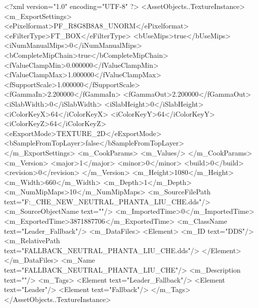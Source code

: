 <?xml version="1.0" encoding="UTF-8" ?>
<AssetObjects..TextureInstance>
	<m_ExportSettings>
		<ePixelformat>PF_R8G8B8A8_UNORM</ePixelformat>
		<eFilterType>FT_BOX</eFilterType>
		<bUseMips>true</bUseMips>
		<iNumManualMips>0</iNumManualMips>
		<bCompleteMipChain>true</bCompleteMipChain>
		<fValueClampMin>0.000000</fValueClampMin>
		<fValueClampMax>1.000000</fValueClampMax>
		<fSupportScale>1.000000</fSupportScale>
		<fGammaIn>2.200000</fGammaIn>
		<fGammaOut>2.200000</fGammaOut>
		<iSlabWidth>0</iSlabWidth>
		<iSlabHeight>0</iSlabHeight>
		<iColorKeyX>64</iColorKeyX>
		<iColorKeyY>64</iColorKeyY>
		<iColorKeyZ>64</iColorKeyZ>
		<eExportMode>TEXTURE_2D</eExportMode>
		<bSampleFromTopLayer>false</bSampleFromTopLayer>
	</m_ExportSettings>
	<m_CookParams>
		<m_Values/>
	</m_CookParams>
	<m_Version>
		<major>1</major>
		<minor>0</minor>
		<build>0</build>
		<revision>0</revision>
	</m_Version>
	<m_Height>1080</m_Height>
	<m_Width>660</m_Width>
	<m_Depth>1</m_Depth>
	<m_NumMipMaps>10</m_NumMipMaps>
	<m_SourceFilePath text="F:\MOD\TEMPLATE\LIU_CHE_NEW\FALLBACK_NEUTRAL_PHANTA_LIU_CHE.dds"/>
	<m_SourceObjectName text=""/>
	<m_ImportedTime>0</m_ImportedTime>
	<m_ExportedTime>3871887706</m_ExportedTime>
	<m_ClassName text="Leader_Fallback"/>
	<m_DataFiles>
		<Element>
			<m_ID text="DDS"/>
			<m_RelativePath text="FALLBACK_NEUTRAL_PHANTA_LIU_CHE.dds"/>
		</Element>
	</m_DataFiles>
	<m_Name text="FALLBACK_NEUTRAL_PHANTA_LIU_CHE"/>
	<m_Description text=""/>
	<m_Tags>
		<Element text="Leader_Fallback"/>
		<Element text="Leader"/>
		<Element text="Fallback"/>
	</m_Tags>
</AssetObjects..TextureInstance>

